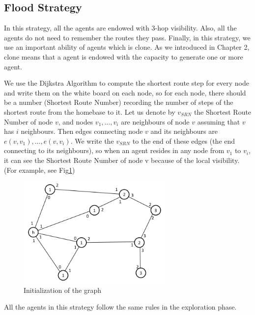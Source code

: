 \subsection{Flood Strategy}
In this strategy, all the agents are endowed with 3-hop visibility. Also, all the agents do not need to remember the routes they pass. Finally, in this strategy, we use an important ability of agents which is clone. As we introduced in Chapter 2, clone means that a agent is endowed with the capacity to generate one or more agent. 

We use the Dijkstra Algorithm to compute the shortest route step for every node and write them on the white board on each node, so for each node, there should be a number (Shortest Route Number) recording the number of steps of the shortest route from the homebase to it. Let us denote by $v_{SRN}$ the Shortest Route Number of node $v$, and nodes ${v_1, \ldots, v_i}$ are neighbours of node $v$ assuming that $v$ has $i$ neighbours. Then edges connecting node $v$ and its neighbours are $e(v, v_1), \ldots, e(v, v_i)$. We write the $v_{SRN}$ to the end of these edges (the end connecting to its neighbours), so when an agent resides in any node from $v_1$ to $v_i$, it can see the Shortest Route Number of node v because of the local visibility. (For example, see Fig\ref{fig:Arbi1}) 

\begin{figure}[H]
  \centering  
  \includegraphics[width=3in]{figures/Arbi1.png}
  \caption{Initialization of the graph}\label{fig:Arbi1}
\end{figure}

All the agents in this strategy follow the same rules in the exploration phase.

